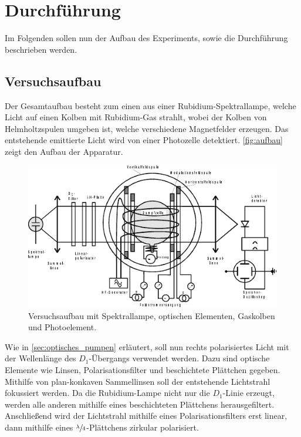 \section{Durchführung}
\label{sec:durchfuehrung}

    Im Folgenden sollen nun der Aufbau des Experiments,
    sowie die Durchführung beschrieben werden.

\subsection{Versuchsaufbau}

    Der Gesamtaufbau besteht zum einen aus einer Rubidium-Spektrallampe,
    welche Licht auf einen Kolben mit Rubidium-Gas strahlt,
    wobei der Kolben von Helmholtzspulen umgeben ist,
    welche verschiedene Magnetfelder erzeugen.
    Das entstehende emittierte Licht wird von einer Photozelle detektiert.
    \autoref{fig:aufbau} zeigt den Aufbau der Apparatur.
    \begin{figure}
        \centering
        \includegraphics[width=\textwidth]{content/img/Abb_1.pdf}
        \caption{Versuchsaufbau mit Spektrallampe, optischen Elementen, Gaskolben und Photoelement. \cite{versuchsanleitung}}
        \label{fig:aufbau}
    \end{figure}

    Wie in \autoref{sec:optisches_pumpen} erläutert,
    soll nun rechts polarisiertes Licht mit der Wellenlänge des $D_1$-Übergangs verwendet werden.
    Dazu sind optische Elemente wie Linsen,
    Polarisationsfilter und beschichtete Plättchen gegeben.
    Mithilfe von plan-konkaven Sammellinsen soll der entstehende Lichtstrahl fokussiert werden.
    Da die Rubidium-Lampe nicht nur die $D_1$-Linie erzeugt,
    werden alle anderen mithilfe eines beschichteten Plättchens herausgefiltert.
    Anschließend wird der Lichtstrahl mithilfe eines Polarisationsfilters erst linear,
    dann mithilfe eines $\sfrac{\lambda}{4}$-Plättchens zirkular polarisiert.

